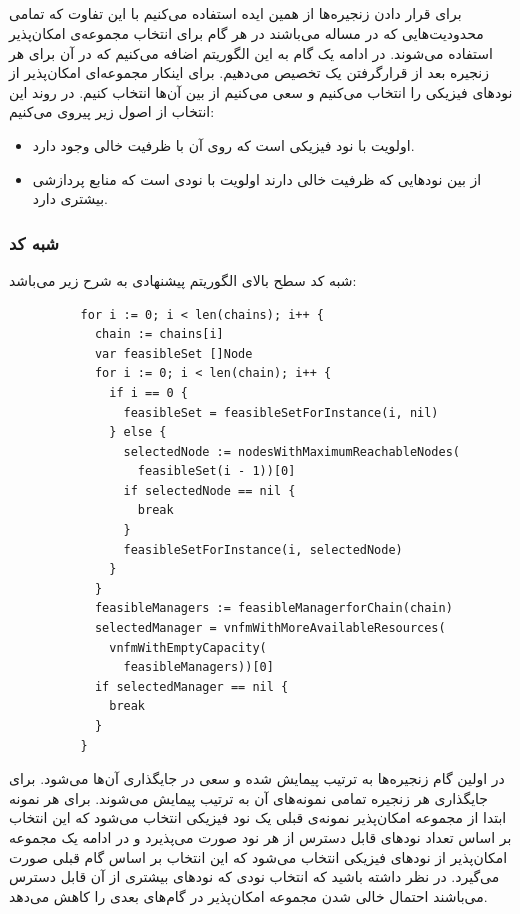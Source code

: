 \subsection{}

برای قرار دادن زنجیره‌ها از همین ایده استفاده می‌کنیم با این تفاوت
که تمامی محدودیت‌هایی که در مساله می‌باشند در هر گام برای انتخاب مجموعه‌ی امکان‌پذیر استفاده می‌شوند.
در ادامه یک گام به این الگوریتم اضافه می‌کنیم که در آن برای هر زنجیره بعد از قرارگرفتن یک
تخصیص می‌دهیم. برای اینکار مجموعه‌ای امکان‌پذیر از نودهای فیزیکی را انتخاب می‌کنیم
و سعی می‌کنیم از بین آن‌ها انتخاب کنیم. در روند این انتخاب از اصول زیر پیروی می‌کنیم:

\begin{itemize}
    \item اولویت با نود فیزیکی است که روی آن  با ظرفیت خالی وجود دارد.
    \item از بین نودهایی که ظرفیت خالی دارند اولویت با نودی است که منابع پردازشی بیشتری دارد.
\end{itemize}

\subsubsection{شبه کد}

شبه کد سطح بالای الگوریتم پیشنهادی به شرح زیر می‌باشد:

\begin{latin}
    \begin{verbatim}
          for i := 0; i < len(chains); i++ {
            chain := chains[i]
            var feasibleSet []Node
            for i := 0; i < len(chain); i++ {
              if i == 0 {
                feasibleSet = feasibleSetForInstance(i, nil)
              } else {
                selectedNode := nodesWithMaximumReachableNodes(
                  feasibleSet(i - 1))[0]
                if selectedNode == nil {
                  break
                }
                feasibleSetForInstance(i, selectedNode)
              }
            }
            feasibleManagers := feasibleManagerforChain(chain)
            selectedManager = vnfmWithMoreAvailableResources(
              vnfmWithEmptyCapacity(
                feasibleManagers))[0]
            if selectedManager == nil {
              break
            }
          }
    \end{verbatim}
\end{latin}

در اولین گام زنجیره‌ها به ترتیب پیمایش  شده و سعی در جایگذاری آن‌ها می‌شود.
برای جایگذاری هر زنجیره تمامی نمونه‌های آن به ترتیب پیمایش می‌شوند.
برای هر نمونه ابتدا از مجموعه امکان‌پذیر نمونه‌ی قبلی یک نود فیزیکی انتخاب می‌شود که این انتخاب بر اساس تعداد نودهای قابل دسترس از هر نود صورت می‌پذیرد و
در ادامه یک مجموعه امکان‌پذیر از نودهای فیزیکی انتخاب می‌شود که این انتخاب بر اساس گام قبلی صورت می‌گیرد.
در نظر داشته باشید که انتخاب نودی که نودهای بیشتری از آن قابل دسترس می‌باشند احتمال خالی شدن مجموعه امکان‌پذیر در گام‌های بعدی را کاهش می‌دهد.

